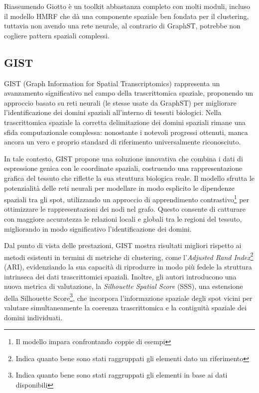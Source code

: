 Riassumendo Giotto è un toolkit abbastanza completo con molti moduli, 
incluso il modello HMRF che dà una componente spaziale 
ben fondata per il clustering, 
tuttavia non avendo una rete neurale, al contrario di GraphST, 
potrebbe non cogliere pattern spaziali complessi.

\subsection{GIST}\label{subsec:GIST}
GIST (Graph Information for Spatial Transcriptomics) rappresenta un avanzamento significativo 
nel campo della trascrittomica spaziale, 
proponendo un approccio basato su reti neurali (le stesse usate da GraphST) per migliorare 
l'identificazione dei domini spaziali all'interno di tessuti biologici.
Nella trascrittomica spaziale la corretta delimitazione dei domini spaziali 
rimane una sfida computazionale complessa: 
nonostante i notevoli progressi ottenuti, manca ancora un vero e 
proprio standard di riferimento universalmente riconosciuto.

In tale contesto, GIST propone una soluzione innovativa che 
combina i dati di espressione genica con le coordinate spaziali, 
costruendo una rappresentazione grafica del tessuto che riflette 
la sua struttura biologica reale. 
Il modello sfrutta le potenzialità delle reti neurali per 
modellare in modo esplicito le dipendenze spaziali tra gli spot, 
utilizzando un approccio di apprendimento contrastivo\footnote{Il modello impara confrontando coppie di esempi} per ottimizzare le 
rappresentazioni dei nodi nel grafo. 
Questo consente di catturare con maggiore accuratezza le 
relazioni locali e globali tra le regioni del tessuto, 
migliorando in modo significativo l'identificazione dei domini.

Dal punto di vista delle prestazioni, GIST mostra 
risultati migliori rispetto ai metodi esistenti 
in termini di metriche di clustering, 
come l'\textit{Adjusted Rand Index}\footnote{Indica quanto bene sono stati raggruppati gli elementi dato un riferimento} (ARI), 
evidenziando la sua capacità di riprodurre in modo più fedele 
la struttura intrinseca dei dati trascrittomici spaziali. 
Inoltre, gli autori introducono una nuova metrica di valutazione, 
la \textit{Silhouette Spatial Score} (SSS), una estensione della Silhouette Score\footnote{Indica quanto bene sono stati raggruppati gli elementi in base ai dati disponibili}, 
che incorpora l'informazione spaziale degli spot vicini per 
valutare simultaneamente la coerenza trascrittomica e 
la contiguità spaziale dei domini individuati.

